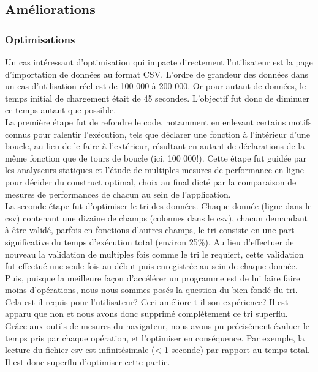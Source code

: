 \documentclass[a4paper,french,12pt]{article}
\begin{document}
	
  \subsection{Améliorations}
	\subsubsection{Optimisations}
	Un cas intéressant d'optimisation qui impacte directement l'utilisateur est la page d'importation de données au format CSV.
	L'ordre de grandeur des données dans un cas d'utilisation réel est de 100 000 à 200 000. Or pour autant de données, le temps initial de chargement était de 45 secondes. L'objectif fut donc de diminuer ce temps autant que possible.~\\	
	
	La première étape fut de refondre le code, notamment en enlevant certains motifs connus pour ralentir l'exécution, tels que déclarer une fonction à l'intérieur d'une boucle, au lieu de le faire à l'extérieur, résultant en autant de déclarations de la même fonction que de tours de boucle (ici, 100 000!). Cette étape fut guidée par les analyseurs statiques et l'étude de multiples mesures de performance en ligne pour décider du construct optimal, choix au final dicté par la comparaison de mesures de performances de chacun au sein de l'application.~\\	
	
	La seconde étape fut d'optimiser le tri des données. Chaque donnée (ligne dans le csv) contenant une dizaine de champs (colonnes dans le csv), chacun demandant à être validé, parfois en fonctions d'autres champs, le tri consiste en une part significative du temps d'exécution total (environ 25\%). Au lieu d'effectuer de nouveau la validation de multiples fois comme le tri le requiert, cette validation fut effectué une seule fois au début puis enregistrée au sein de chaque donnée. 
	Puis, puisque la meilleure façon d'accélérer un programme est de lui faire faire moins d'opérations, nous nous sommes posés la question du bien fondé du tri. Cela est-il requis pour l'utilisateur? Ceci améliore-t-il son expérience? Il est apparu que non et nous avons donc supprimé complètement ce tri superflu.~\\	
	
	Grâce aux outils de mesures du navigateur, nous avons pu précisément évaluer le temps pris par chaque opération, et l'optimiser en conséquence. Par exemple, la lecture du fichier csv est infinitésimale (< 1 seconde) par rapport au temps total. Il est donc superflu d'optimiser cette partie.~\\	
	
\end{document}
